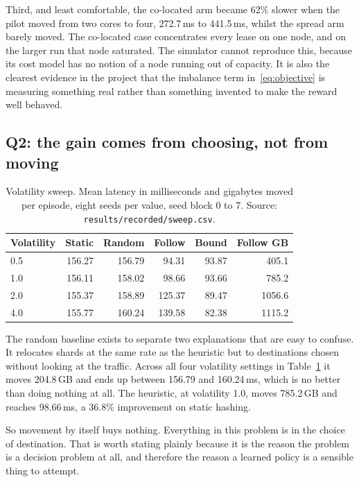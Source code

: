 Third, and least comfortable, the co-located arm became 62\% slower when
the pilot moved from two cores to four, 272.7\,ms to 441.5\,ms, whilst the
spread arm barely moved. The co-located case concentrates every lease on
one node, and on the larger run that node saturated. The simulator cannot
reproduce this, because its cost model has no notion of a node running out
of capacity. It is also the clearest evidence in the project that the
imbalance term in~\eqref{eq:objective} is measuring something real rather
than something invented to make the reward well behaved.

\subsection{Q2: the gain comes from choosing, not from moving}

\begin{table}[t]
\caption{Volatility sweep. Mean latency in milliseconds and gigabytes moved
per episode, eight seeds per value, seed block 0 to 7. Source:
\texttt{results/recorded/sweep.csv}.}
\label{tab:sweep}
\centering
\begin{tabular}{lrrrrr}
\toprule
Volatility & Static & Random & Follow & Bound & Follow GB \\
\midrule
0.5 & 156.27 & 156.79 &  94.31 & 93.87 &  405.1 \\
1.0 & 156.11 & 158.02 &  98.66 & 93.66 &  785.2 \\
2.0 & 155.37 & 158.89 & 125.37 & 89.47 & 1056.6 \\
4.0 & 155.77 & 160.24 & 139.58 & 82.38 & 1115.2 \\
\bottomrule
\end{tabular}
\end{table}

The random baseline exists to separate two explanations that are easy to
confuse. It relocates shards at the same rate as the heuristic but to
destinations chosen without looking at the traffic. Across all four
volatility settings in Table~\ref{tab:sweep} it moves 204.8\,GB and ends up
between 156.79 and 160.24\,ms, which is no better than doing nothing at
all. The heuristic, at volatility 1.0, moves 785.2\,GB and reaches
98.66\,ms, a 36.8\% improvement on static hashing.

So movement by itself buys nothing. Everything in this problem is in the
choice of destination. That is worth stating plainly because it is the
reason the problem is a decision problem at all, and therefore the reason a
learned policy is a sensible thing to attempt.

